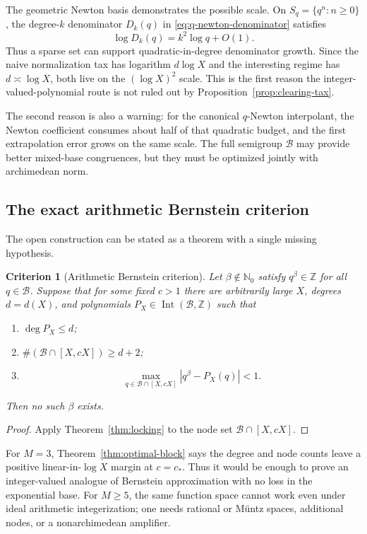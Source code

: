 \documentclass[11pt,oneside]{article}
\newtheorem{criterion}[theorem]{Criterion}
\theoremstyle{definition}
\theoremstyle{remark}
\newcommand{\Nzero}{\mathbb N_0}
\newcommand{\Z}{\mathbb Z}
\newcommand{\Bsem}{\mathcal B}
\newcommand{\Int}{\operatorname{Int}}
\begin{document}
The geometric Newton basis demonstrates the possible scale.  On
$S_q=\{q^n:n\ge0\}$, the degree-$k$ denominator
$D_k(q)$ in \eqref{eq:q-newton-denominator} satisfies
\[
 \log D_k(q)=k^2\log q+O(1).
\]
Thus a sparse set can support quadratic-in-degree denominator growth.  Since the naive
normalization tax has logarithm $d\log X$ and the interesting regime has $d\asymp\log X$,
both live on the $(\log X)^2$ scale.  This is the first reason the integer-valued-polynomial
route is not ruled out by Proposition~\ref{prop:clearing-tax}.

The second reason is also a warning: for the canonical $q$-Newton interpolant, the Newton
coefficient consumes about half of that quadratic budget, and the first extrapolation error
grows on the same scale.  The full semigroup $\Bsem$ may provide better mixed-base
congruences, but they must be optimized jointly with archimedean norm.

\subsection{The exact arithmetic Bernstein criterion}

The open construction can be stated as a theorem with a single missing hypothesis.

\begin{criterion}[Arithmetic Bernstein criterion]
\label{crit:arithmetic-bernstein}
Let $\beta\notin\Nzero$ satisfy $q^\beta\in\Z$ for all $q\in\Bsem$.  Suppose that for some
fixed $c>1$ there are arbitrarily large $X$, degrees $d=d(X)$, and polynomials
$P_X\in\Int(\Bsem,\Z)$ such that
\begin{enumerate}
\item $\deg P_X\le d$;
\item $\#(\Bsem\cap[X,cX])\ge d+2$;
\item
\[
 \max_{q\in\Bsem\cap[X,cX]}|q^\beta-P_X(q)|<1.
\]
\end{enumerate}
Then no such $\beta$ exists.
\end{criterion}

\begin{proof}
Apply Theorem~\ref{thm:locking} to the node set
$\Bsem\cap[X,cX]$.
\end{proof}

For $M=3$, Theorem~\ref{thm:optimal-block} says the degree and node counts leave a positive
linear-in-$\log X$ margin at $c=c_*$.  Thus it would be enough to prove an
integer-valued analogue of Bernstein approximation with no loss in the exponential base.
For $M\ge5$, the same function space cannot work even under ideal arithmetic
integerization; one needs rational or M\"untz spaces, additional nodes, or a nonarchimedean
amplifier.
\end{document}
